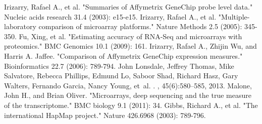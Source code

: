 \documentclass[a4paper,12pt]{article}
\begin{document}
\begin{thebibliography}{50}

 Irizarry, Rafael A., et al. "Summaries of Affymetrix GeneChip probe level data." Nucleic acids research 31.4 (2003): e15-e15.
 Irizarry, Rafael A., et al. "Multiple-laboratory comparison of microarray platforms." Nature Methods 2.5 (2005): 345-350.
 Fu, Xing, et al. "Estimating accuracy of RNA-Seq and microarrays with proteomics." BMC Genomics 10.1 (2009): 161.
 Irizarry, Rafael A., Zhijin Wu, and Harris A. Jaffee. "Comparison of Affymetrix GeneChip expression measures." Bioinformatics 22.7 (2006): 789-794.
John Lonsdale, Jeffrey Thomas, Mike Salvatore, Rebecca Phillips, Edmund Lo,
  Saboor Shad, Richard Hasz, Gary Walters, Fernando Garcia, Nancy Young, et~al.
.
, 45(6):580--585, 2013.
 Malone, John H., and Brian Oliver. "Microarrays, deep sequencing and the true measure of the transcriptome." BMC biology 9.1 (2011): 34.
 Gibbs, Richard A., et al. "The international HapMap project." Nature 426.6968 (2003): 789-796.

\end{thebibliography}

\pagebreak
\appendix
\end{document}

